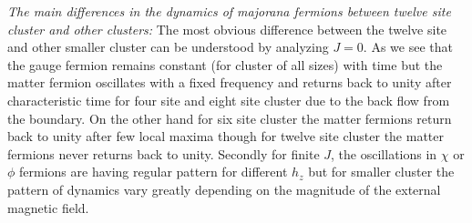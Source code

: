 \documentclass[aps,amsmath,twocolumn,amssymb,floatfix,showpacs,superscriptaddress,nofootinbib,longbibliography]{revtex4-1}
\begin{document}
{\small {\it {The main differences in the dynamics of majorana fermions between twelve site cluster and other clusters:}}} The most obvious difference between the twelve site and other smaller cluster can be understood by analyzing $J=0$. As we see that the gauge fermion remains constant (for cluster of all sizes) with time but the matter fermion oscillates with a fixed frequency and returns back to unity after characteristic time for four site and eight site cluster due to the back flow from the boundary. On the other hand for six site cluster the matter fermions return back to unity after few local maxima though for twelve site cluster the matter fermions never returns back to unity. Secondly  for finite $J$, the oscillations in $\chi$ or $\phi$ fermions are having regular pattern for different  $h_z$ but for smaller cluster the pattern of dynamics vary greatly depending on the magnitude of the external magnetic field.\\
\end{document}
